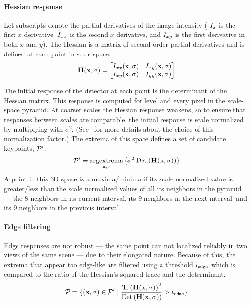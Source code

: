         \paragraph{Hessian response}
            Let subscripts denote the partial derivatives of the image intensity (\eg{} $I_{x}$ is the first $x$
            derivative, $I_{xx}$ is the second $x$ derivative, and $I_{xy}$ is the first derivative in both
            $x$ and $y$). The Hessian is a matrix of second order partial derivatives and is defined at each point
            in scale space.
            \begin{equation}
                \mathbf{H}(\mathbf{x}, \sigma) = 
                 \left[ \begin{matrix} 
                I_{xx}(\mathbf{x}, \sigma) & I_{xy}(\mathbf{x}, \sigma) \\
                I_{xy}(\mathbf{x}, \sigma) & I_{yy}(\mathbf{x}, \sigma)  \end{matrix} \right]  
            \end{equation}\label{eqn:hessianmatrix}  


            The initial response of the detector at each point is the determinant of the Hessian matrix. This
            response is computed for level and every pixel in the scale-space pyramid. At coarser scales the
            Hessian response weakens, so to ensure that responses between scales are comparable, the initial
            response is scale normalized by multiplying with $\sigma^2$. (See~\cite{lindeberg_feature_1998} for
            more details about the choice of this normalization factor.) The extrema of this space defines a set of
            candidate keypoints, $\mathcal{P}'$.
            \begin{equation}
                \mathcal{P}' = \underset{\mathbf{x},\sigma}{\operatorname{argextrema}} \left(\sigma^2 \mathbin{\textrm{Det}}\left(\mathbf{H}(\mathbf{x}, \sigma)\right)\right) 
            \end{equation}
            A point in this 3D space is a maxima/minima if its scale normalized value is greater/less than the
            scale normalized values of all its neighbors in the pyramid --- \ie{} the $8$ neighbors in its current
            interval, its $9$ neighbors in the next interval, and its $9$ neighbors in the previous interval.

        \paragraph{Edge filtering}
            Edge responses are not robust --- \ie{} the same point can not localized reliably in two views of the
            same scene --- due to their elongated nature. Because of this, the extrema that appear too edge-like
            are filtered using a threshold $t_{\tt{edge}}$ which is compared to the ratio of the Hessian's squared
            trace and the determinant.
            \begin{equation}
                \mathcal{P} = \{(\mathbf{x}, \sigma) \in \mathcal{P}' \mid
                  \frac{\mathbin{\textrm{Tr}}\left(\mathbf{H}(\mathbf{x}, \sigma)\right)^2}{\mathbin{\textrm{Det}}\left(\mathbf{H}(\mathbf{x}, \sigma)\right)} > t_{\tt{edge}}\}
            \end{equation}

